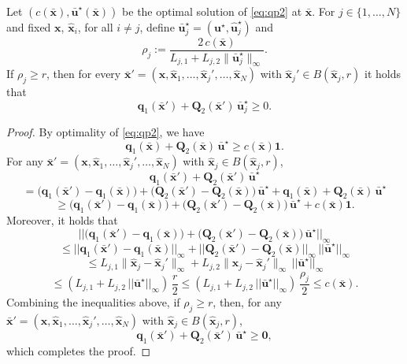 \begin{proposition}
    Let $(c(\bar{\mathbf{x}}), \bar{\mathbf{u}}^\star(\bar{\mathbf{x}}))$ be the optimal solution of \eqref{eq:qp2} at $\bar{\mathbf{x}}$. For $j \in \{1,\dots,N\}$ and fixed $\mathbf{x}$, $\hat{\mathbf{x}}_i$, for all $i \neq j$,  define $\bar{\mathbf{u}}_j^\star = (\mathbf{u}^\star, \hat{\mathbf{u}}_j^\star)$ and
    \[
        \rho_j := \frac{2 \, c(\bar{\mathbf{x}})} {L_{j,1}+L_{j,2}\|\bar{\mathbf{u}}_j^\star\|_\infty}.
    \]
    If $\rho_j \ge r$, then for every $\bar{\mathbf{x}}' = (\mathbf{x}, \hat{\mathbf{x}}_1, \dots, \hat{\mathbf{x}}_j', \dots, \hat{\mathbf{x}}_N)$ with $\hat{\mathbf{x}}_j' \in B(\hat{\mathbf{x}}_j,r)$ it holds that
    \[
        \mathbf{q}_1(\bar{\mathbf{x}}') + \mathbf{Q}_2(\bar{\mathbf{x}}') \, \bar{\mathbf{u}}_j^\star \ge 0.
    \]
\end{proposition}
\begin{proof}
By optimality of \eqref{eq:qp2}, we have
\[
    \mathbf{q}_1(\bar{\mathbf{x}}) + \mathbf{Q}_2(\bar{\mathbf{x}}) \, \bar{\mathbf{u}}^\star \geq c(\bar{\mathbf{x}}) \mathbf{1}.
\]
For any $\bar{\mathbf{x}}' = (\mathbf{x}, \hat{\mathbf{x}}_1, \dots, \hat{\mathbf{x}}_j', \dots, \hat{\mathbf{x}}_N)$ with $\hat{\mathbf{x}}_j \in B(\hat{\mathbf{x}}_j,r)$,
\[
    \mathbf{q}_1(\bar{\mathbf{x}}') + \mathbf{Q}_2(\bar{\mathbf{x}}') \, \bar{\mathbf{u}}^\star
\] \[    
    = \!\! \big( \mathbf{q}_1(\bar{\mathbf{x}}') - \mathbf{q}_1(\bar{\mathbf{x}}) \big) + \big( \mathbf{Q}_2(\bar{\mathbf{x}}') - \mathbf{Q}_2(\bar{\mathbf{x}}) \big) \, \bar{\mathbf{u}}^\star + \mathbf{q}_1(\bar{\mathbf{x}}) + \mathbf{Q}_2(\bar{\mathbf{x}}) \, \bar{\mathbf{u}}^\star 
\] \[
    \geq \big( \mathbf{q}_1(\bar{\mathbf{x}}') - \mathbf{q}_1(\bar{\mathbf{x}}) \big) + \big( \mathbf{Q}_2(\bar{\mathbf{x}}') - \mathbf{Q}_2(\bar{\mathbf{x}}) \big) \, \bar{\mathbf{u}}^\star +  c(\bar{\mathbf{x}}) \mathbf{1}.
\]
Moreover, it holds that
\[
    || \big( \mathbf{q}_1(\bar{\mathbf{x}}') - \mathbf{q}_1(\bar{\mathbf{x}}) \big) + \big( \mathbf{Q}_2(\bar{\mathbf{x}}') - \mathbf{Q}_2(\bar{\mathbf{x}}) \big) \, \bar{\mathbf{u}}^\star ||_\infty
\] \[
    \leq || \mathbf{q}_1(\bar{\mathbf{x}}') - \mathbf{q}_1(\bar{\mathbf{x}}) ||_\infty + || \mathbf{Q}_2(\bar{\mathbf{x}}') - \mathbf{Q}_2(\bar{\mathbf{x}}) ||_\infty \,||\bar{\mathbf{u}}^\star ||_\infty
\] \[
    \leq L_{j, 1} \|\hat{\mathbf{x}}_j - \hat{\mathbf{x}}_j'\|_\infty + L_{j, 2} \|\hat{\mathbf{x}}_j - \hat{\mathbf{x}}_j'\|_\infty  \,||\bar{\mathbf{u}}^\star ||_\infty
\] \[
    \leq (L_{j, 1} + L_{j, 2} \,||\bar{\mathbf{u}}^\star ||_\infty) \, \frac{r}{2} \leq (L_{j, 1} + L_{j, 2} \,||\bar{\mathbf{u}}^\star ||_\infty) \, \frac{\rho_j}{2} \leq c(\bar{\mathbf{x}}).
\]
Combining the inequalities above, if $\rho_j \geq r$, then, for any $\bar{\mathbf{x}}' = (\mathbf{x}, \hat{\mathbf{x}}_1, \dots, \hat{\mathbf{x}}_j', \dots, \hat{\mathbf{x}}_N)$ with $\hat{\mathbf{x}}_j \in B(\hat{\mathbf{x}}_j,r)$,
\[
    \mathbf{q}_1(\bar{\mathbf{x}}') + \mathbf{Q}_2(\bar{\mathbf{x}}') \, \bar{\mathbf{u}}^\star \geq \mathbf{0},
\]
which completes the proof.
\end{proof}